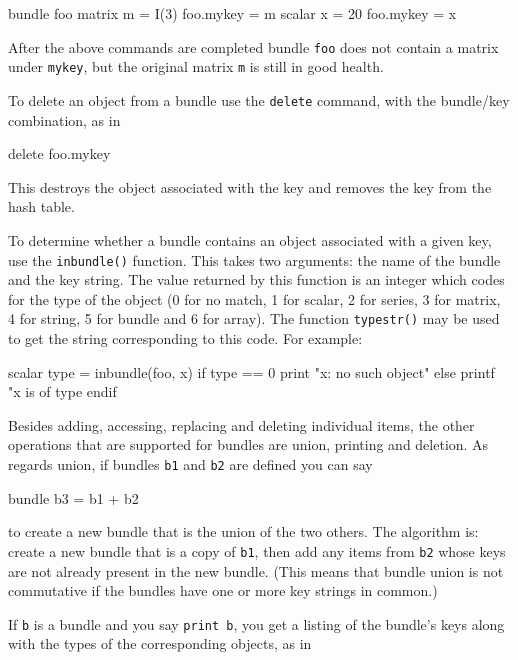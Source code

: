 \begin{code}
bundle foo
matrix m = I(3)
foo.mykey = m
scalar x = 20
foo.mykey = x
\end{code}

After the above commands are completed bundle \texttt{foo} does not
contain a matrix under \texttt{mykey}, but the original matrix
\texttt{m} is still in good health.

To delete an object from a bundle use the \texttt{delete} command,
with the bundle/key combination, as in

\begin{code}
delete foo.mykey
\end{code}

This destroys the object associated with the key and removes the key
from the hash table.

To determine whether a bundle contains an object associated with a
given key, use the \texttt{inbundle()} function. This takes two
arguments: the name of the bundle and the key string. The value
returned by this function is an integer which codes for the type of
the object (0 for no match, 1 for scalar, 2 for series, 3 for matrix,
4 for string, 5 for bundle and 6 for array). The function
\texttt{typestr()} may be used to get the string corresponding to this
code. For example:

\begin{code}
scalar type = inbundle(foo, x)
if type == 0
  print "x: no such object"
else
  printf "x is of type %
endif
\end{code}

Besides adding, accessing, replacing and deleting individual items,
the other operations that are supported for bundles are union,
printing and deletion. As regards union, if bundles \texttt{b1} and
\texttt{b2} are defined you can say

\begin{code}
bundle b3 = b1 + b2
\end{code}

to create a new bundle that is the union of the two others. The
algorithm is: create a new bundle that is a copy of \texttt{b1}, then
add any items from \texttt{b2} whose keys are not already present in
the new bundle. (This means that bundle union is not commutative if
the bundles have one or more key strings in common.)

If \texttt{b} is a bundle and you say \texttt{print b}, you get a
listing of the bundle's keys along with the types of the corresponding
objects, as in

